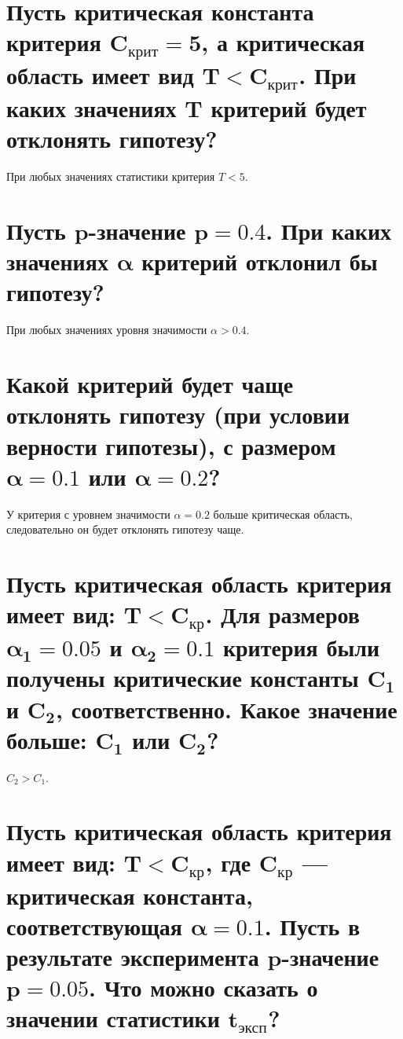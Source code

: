 \documentclass{article}
\begin{document}

\section{Пусть критическая константа критерия $\bm{C_\text{крит} = 5}$, а критическая область имеет вид $\bm{T < C_\text{крит}}$. При каких значениях $\bm{T}$ критерий будет отклонять гипотезу?}

При любых значениях статистики критерия $T < 5$.


\section{Пусть $\bm{p}$-значение $\bm{p = 0.4}$. При каких значениях $\bm\alpha$ критерий отклонил бы гипотезу?}

При любых значениях уровня значимости $\alpha > 0.4$.


\section{Какой критерий будет чаще отклонять гипотезу (при условии верности гипотезы), с размером $\bm{\alpha = 0.1}$ или $\bm{\alpha = 0.2}$?}

У критерия с уровнем значимости $\alpha = 0.2$ больше критическая область, следовательно он будет отклонять гипотезу чаще.


\section{Пусть критическая область критерия имеет вид: $\bm{T < C_\text{кр}}$. Для размеров $\bm{\alpha_1 =
0.05}$ и $\bm{\alpha_2 = 0.1}$ критерия были получены критические константы $\bm{C_1}$ и $\bm{C_2}$, соответственно. Какое значение больше: $\bm{C_1}$ или $\bm{C_2}$?}

$C_2 > C_1$.


\section{Пусть критическая область критерия имеет вид: $\bm{T < C_\text{кр}}$, где $\bm{C_\text{кр}}$ --- критическая константа, соответствующая $\bm{\alpha = 0.1}$. Пусть в результате эксперимента $\bm{p}$-значение $\bm{p = 0.05}$. Что можно сказать о значении статистики $\bm{t_\text{эксп}}$?}
\end{document}
